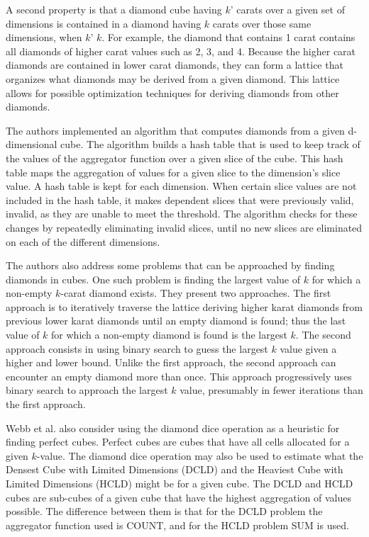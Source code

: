 \documentclass[12pt]{article}
\begin{document}
A second property is that a diamond cube having $k$’ carats over a given set of dimensions is contained in a diamond having $k$ carats over those same
dimensions, when $k$’ \geq $k$. For example, the diamond that contains 1 carat contains all diamonds of higher carat values such as 2, 3, and 4. Because the
higher carat diamonds are contained in lower carat diamonds, they can form a lattice that organizes what diamonds may be derived from a given diamond. This
lattice allows for possible optimization techniques for deriving diamonds from other diamonds.

The authors implemented an algorithm that computes diamonds from a given d-dimensional cube. The algorithm builds a hash table that is used to keep track of the
values of the aggregator function over a given slice of the cube. This hash table maps the aggregation of values for a given slice to the dimension’s slice
value. A hash table is kept for each dimension. When certain slice values are not included in the hash table, it makes dependent slices that were previously
valid, invalid, as they are unable to meet the threshold. The algorithm checks for these changes by repeatedly eliminating invalid slices, until no new slices
are eliminated on each of the different dimensions.

The authors also address some problems that can be approached by finding diamonds in cubes. One such problem is finding the largest value of $k$ for which a
non-empty $k$-carat diamond exists. They present two approaches. The first approach is to iteratively traverse the lattice deriving higher karat diamonds from
previous lower karat diamonds until an empty diamond is found; thus the last value of $k$ for which a non-empty diamond is found is the largest $k$. The second
approach consists in using binary search to guess the largest $k$ value given a higher and lower bound. Unlike the first approach, the second approach can
encounter an empty diamond more than once. This approach progressively uses binary search to approach the largest $k$ value, presumably in fewer iterations than
the first approach.

Webb et al. also consider using the diamond dice operation as a heuristic for finding perfect cubes. Perfect cubes are cubes that have all cells allocated for a
given $k$-value. The diamond dice operation may also be used to estimate what the Densest Cube with Limited Dimensions (DCLD) and the Heaviest Cube with Limited
Dimensions (HCLD) might be for a given cube. The DCLD and HCLD cubes are sub-cubes of a given cube that have the highest aggregation of values possible. The
difference between them is that for the DCLD problem the aggregator function used is COUNT, and for the HCLD problem SUM is used.
\end{document}
